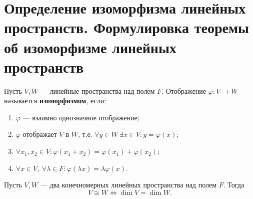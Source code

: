 \section{Определение изоморфизма линейных пространств. Формулировка теоремы об изоморфизме линейных пространств}

\begin{definition}
Пусть $V, W$ --- линейные пространства над полем $F$. Отображение $\varphi: V \to W$ называется \textbf{изоморфизмом}, если:
\begin{enumerate}
    \item $\varphi$ --- взаимно однозначное отображение;
    \item $\varphi$ отображает $V$ в $W$, т.е. $\forall y \in W\ \exists x \in V: y = \varphi(x)$;
    \item $\forall x_1, x_2 \in V: \varphi(x_1 + x_2) = \varphi(x_1) + \varphi(x_2)$;
    \item $\forall x \in V,\ \forall \lambda \in F: \varphi(\lambda x) = \lambda \varphi(x)$.
\end{enumerate}
\end{definition}

\begin{theorem}
Пусть $V, W$ --- два конечномерных линейных пространства над полем $F$. Тогда
\[
V \cong W \iff \dim V = \dim W.
\]
\end{theorem}

